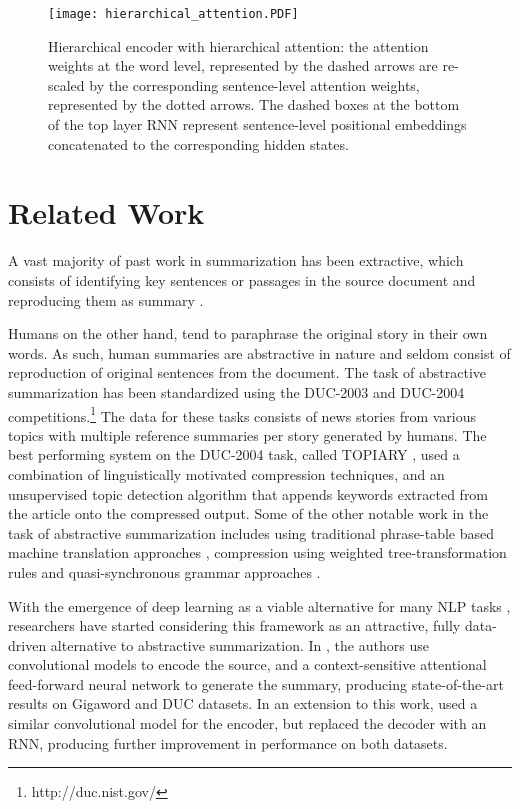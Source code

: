 \documentclass[11pt]{article}
\begin{document}
\begin{figure}[ht]
    \vspace{-0.3in}
	\centering
  \texttt{[image: hierarchical\_attention.PDF]}
  	\vspace{-0.6in}
	\caption{{\small Hierarchical encoder with hierarchical attention: the attention weights at the word level, represented by the dashed arrows are re-scaled by the corresponding sentence-level attention weights, represented by the dotted arrows. The dashed boxes at the bottom of the top layer RNN represent sentence-level positional embeddings concatenated to the corresponding hidden states.}}
	\label{fig:hierarchical_attention}
\end{figure}





 \section{Related Work}\label{sec:related_work}

A vast majority of past work in summarization has been extractive, which consists of identifying key sentences or passages in the source document and reproducing them as summary \cite{neto:2002:ATS,extractive,wong:2008:ESU,filippovaA13:EMNLP,colmenares:NAACL2015,graph_based,key_phrases,key_passages}.


Humans on the other hand, tend to paraphrase the original story in their own words. As such, human summaries are abstractive in nature and seldom consist of reproduction of original sentences from the document. The task of abstractive summarization has been standardized using the DUC-2003 and DUC-2004 competitions.\footnote{http://duc.nist.gov/} The data for these tasks consists of news stories from various topics with multiple reference summaries per story generated by humans. 
The best performing system on the DUC-2004 task, called TOPIARY \cite{topiary}, used a combination of linguistically motivated compression techniques, and an unsupervised topic detection algorithm that appends keywords extracted from the article onto the compressed output. Some of the other notable work in the task of abstractive summarization includes using traditional phrase-table based machine translation approaches \cite{mt4summ}, compression using weighted tree-transformation rules \cite{cohn_lapata} and quasi-synchronous grammar approaches \cite{woodsend}.



With the emergence of deep learning as a viable alternative for many NLP tasks \cite{nlp_from_scratch}, researchers have started considering this framework as an  attractive, fully data-driven alternative to abstractive summarization. 
In , the authors use convolutional models to encode the source, and a context-sensitive attentional feed-forward neural network to generate the summary, producing state-of-the-art results on Gigaword and DUC datasets. In an extension to this work,  used a similar convolutional model for the encoder, but replaced the decoder with an RNN, producing further improvement in performance on both datasets.
\end{document}
